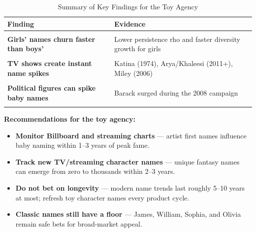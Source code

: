 \documentclass[
]{article}
\providecommand{\tightlist}{%
  \setlength{\itemsep}{0pt}\setlength{\parskip}{0pt}}
\begin{document}
\begin{longtabu} to 
\caption{\label{tab:summary-table}Summary of Key Findings for the Toy Agency}\\
\toprule
Finding & Evidence\\
\midrule
\textbf{} & \\
\textbf{Girls' names churn faster than boys'} & Lower persistence rho and faster diversity growth for girls\\
\textbf{} & \\
\textbf{TV shows create instant name spikes} & Katina (1974), Arya/Khaleesi (2011+), Miley (2006)\\
\textbf{} & \\
\addlinespace
\textbf{Political figures can spike baby names} & Barack surged during the 2008 campaign\\
\textbf{} & \\
\bottomrule
\end{longtabu}

\textbf{Recommendations for the toy agency:}

\begin{itemize}
\tightlist
\item
  \textbf{Monitor Billboard and streaming charts} --- artist first names
  influence baby naming within 1--3 years of peak fame.
\item
  \textbf{Track new TV/streaming character names} --- unique fantasy
  names can emerge from zero to thousands within 2--3 years.
\item
  \textbf{Do not bet on longevity} --- modern name trends last roughly
  5--10 years at most; refresh toy character names every product cycle.
\item
  \textbf{Classic names still have a floor} --- James, William, Sophia,
  and Olivia remain safe bets for broad-market appeal.
\end{itemize}
\end{document}
